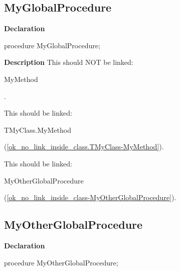 \documentclass{report}
\begin{document}
\subsection*{MyGlobalProcedure}
\begin{list}{}{
\setlength{\itemindent}{0cm}
\setlength{\listparindent}{0cm}
\setlength{\leftmargin}{\evensidemargin}
\addtolength{\leftmargin}{\tmplength}
\settowidth{\labelsep}{X}
\addtolength{\leftmargin}{\labelsep}
\setlength{\labelwidth}{\tmplength}
}
\begin{flushleft}
\item[\textbf{Declaration}\hfill]
\begin{ttfamily}
procedure MyGlobalProcedure;\end{ttfamily}


\end{flushleft}
\par
\item[\textbf{Description}]
This should NOT be linked: \begin{ttfamily}MyMethod\end{ttfamily}.

This should be linked: \begin{ttfamily}TMyClass.MyMethod\end{ttfamily}(\ref{ok_no_link_inside_class.TMyClass-MyMethod}).

This should be linked: \begin{ttfamily}MyOtherGlobalProcedure\end{ttfamily}(\ref{ok_no_link_inside_class-MyOtherGlobalProcedure}).

\end{list}
\subsection*{MyOtherGlobalProcedure}
\begin{list}{}{
\setlength{\itemindent}{0cm}
\setlength{\listparindent}{0cm}
\setlength{\leftmargin}{\evensidemargin}
\addtolength{\leftmargin}{\tmplength}
\settowidth{\labelsep}{X}
\addtolength{\leftmargin}{\labelsep}
\setlength{\labelwidth}{\tmplength}
}
\begin{flushleft}
\item[\textbf{Declaration}\hfill]
\begin{ttfamily}
procedure MyOtherGlobalProcedure;\end{ttfamily}


\end{flushleft}
\end{list}
\end{document}
